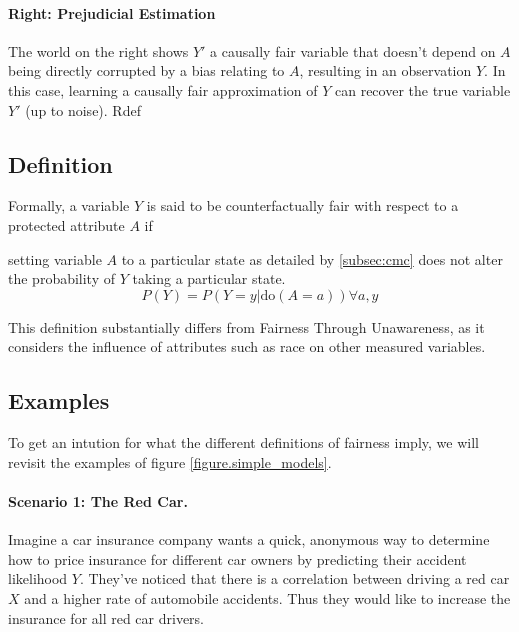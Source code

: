 \paragraph{Right: Prejudicial Estimation} The world on the right shows $Y'$ a
causally fair variable that doesn't depend on $A$ being directly
corrupted by a bias relating to $A$, resulting in an observation
$Y$. In this case, learning a causally fair approximation of $Y$ can
recover the true variable $Y'$ (up to noise).
Rdef
\subsection{Definition}
Formally, a variable $Y$ is said to be counterfactually fair with
respect to a protected attribute $A$ if
\begin{define} setting variable $A$ to a
  particular state as detailed by \ref{subsec:cmc} does not alter the
  probability of $Y$ taking a particular state.
\begin{equation}
P(Y)=P(Y=y|\text{do}(A=a))\forall a,y 
\end{equation}
\end{define}
This definition substantially differs from Fairness Through
Unawareness, as it considers the influence of attributes such as race
on other measured variables.


\subsection{Examples}
To get an intution for what the different definitions of fairness imply, we will
revisit the examples of figure \ref{figure.simple_models}.

\paragraph{Scenario 1: The Red Car.}
Imagine a car insurance company wants a quick, anonymous way to determine how to price insurance for different car owners by predicting their accident likelihood $Y$. They've noticed that there is a correlation between driving a red car $X$ and a higher rate of automobile accidents. Thus they would like to increase the insurance for all red car drivers. 

